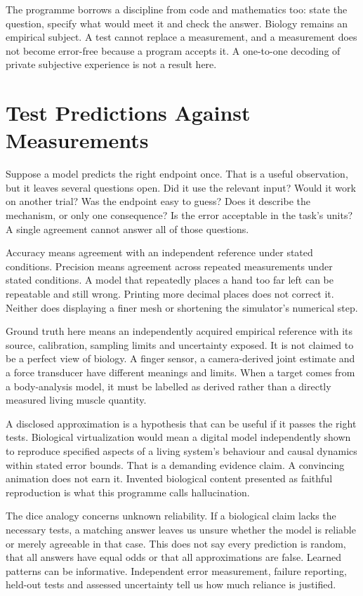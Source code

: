 The programme borrows a discipline from code and mathematics too: state the
question, specify what would meet it and check the answer. Biology remains an
empirical subject. A test cannot replace a measurement, and a measurement does
not become error-free because a program accepts it. A one-to-one decoding of
private subjective experience is not a result here.

\section{Test Predictions Against Measurements}

Suppose a model predicts the right endpoint once. That is a useful observation,
but it leaves several questions open. Did it use the relevant input? Would it
work on another trial? Was the endpoint easy to guess? Does it describe the
mechanism, or only one consequence? Is the error acceptable in the task's units?
A single agreement cannot answer all of those questions.

Accuracy means agreement with an independent reference under stated conditions.
Precision means agreement across repeated measurements under stated conditions.
A model that repeatedly places a hand too far left can be repeatable and still
wrong. Printing more decimal places does not correct it. Neither does displaying
a finer mesh or shortening the simulator's numerical step.\cite{nist1297}

Ground truth here means an independently acquired empirical reference with
its source, calibration, sampling limits and uncertainty exposed. It is not
claimed to be a perfect view of biology. A finger sensor, a camera-derived
joint estimate and a force transducer have different meanings and limits.
When a target comes from a body-analysis model, it must be labelled as derived
rather than a directly measured living muscle quantity.

A disclosed approximation is a hypothesis that can be useful if it passes the
right tests. Biological virtualization would mean a digital model independently
shown to reproduce specified aspects of a living system's behaviour and causal
dynamics within stated error bounds. That is a demanding evidence claim.
A convincing animation does not earn it. Invented biological content presented
as faithful reproduction is what this programme calls hallucination.

The dice analogy concerns unknown reliability. If a biological claim lacks the
necessary tests, a matching answer leaves us unsure whether the model is reliable
or merely agreeable in that case. This does not say every prediction is random,
that all answers have equal odds or that all approximations are false. Learned
patterns can be informative. Independent error measurement, failure reporting,
held-out tests and assessed uncertainty tell us how much reliance is justified.

